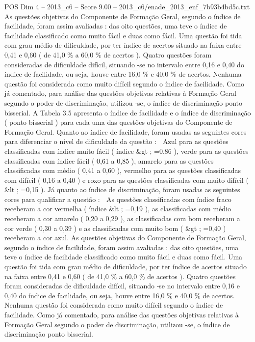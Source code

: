 \begin{textsample}{POS Dim 4 – 2013\_c6 – Score 9.00 – 2013\_c6/enade\_2013\_enf\_7b93b4bd5c.txt}
As questões objetivas do Componente de Formação Geral, segundo o índice de facilidade, foram assim avaliadas : das oito questões, uma teve o índice de facilidade classificado como muito fácil e duas como fácil.
Uma questão foi tida com grau médio de dificuldade, por ter índice de acertos situado na faixa entre 0,41 e 0,60 ( de 41,0 \% a 60,0 \% de acertos ).
Quatro questões foram consideradas de dificuldade difícil, situando -se no intervalo entre 0,16 e 0,40 do índice de facilidade, ou seja, houve entre 16,0 \% e 40,0 \% de acertos.
Nenhuma questão foi considerada como muito difícil segundo o índice de facilidade.
Como já comentado, para análise das questões objetivas relativas à Formação Geral segundo o poder de discriminação, utilizou -se, o índice de discriminação ponto bisserial.
A Tabela 3.5 apresenta o índice de facilidade e o índice de discriminação ( ponto bisserial ) para cada uma das questões objetivas do Componente de Formação Geral.
Quanto ao índice de facilidade, foram usadas as seguintes cores para diferenciar o nível de dificuldade da questão :  Azul para as questões classificadas com índice muito fácil ( índice \&gt ; =0,86 ), verde para as questões classificadas com índice fácil ( 0,61 a 0,85 ), amarelo para as questões classificadas com médio ( 0,41 a 0,60 ), vermelho para as questões classificadas com difícil ( 0,16 a 0,40 ) e roxo para as questões classificadas com muito difícil ( \&lt ; =0,15 ).
Já quanto ao índice de discriminação, foram usadas as seguintes cores para qualificar a questão :  As questões classificadas com índice fraco receberam a cor vermelha ( índice \&lt ; =0,19 ), as classificadas com médio receberam a cor amarelo ( 0,20 a 0,29 ), as classificadas com bom receberam a cor verde ( 0,30 a 0,39 ) e as classificadas com muito bom ( \&gt ; =0,40 ) receberam a cor azul.
As questões objetivas do Componente de Formação Geral, segundo o índice de facilidade, foram assim avaliadas : das oito questões, uma teve o índice de facilidade classificado como muito fácil e duas como fácil.
Uma questão foi tida com grau médio de dificuldade, por ter índice de acertos situado na faixa entre 0,41 e 0,60 ( de 41,0 \% a 60,0 \% de acertos ).
Quatro questões foram consideradas de dificuldade difícil, situando -se no intervalo entre 0,16 e 0,40 do índice de facilidade, ou seja, houve entre 16,0 \% e 40,0 \% de acertos.
Nenhuma questão foi considerada como muito difícil segundo o índice de facilidade.
Como já comentado, para análise das questões objetivas relativas à Formação Geral segundo o poder de discriminação, utilizou -se, o índice de discriminação ponto bisserial.

\end{textsample}
